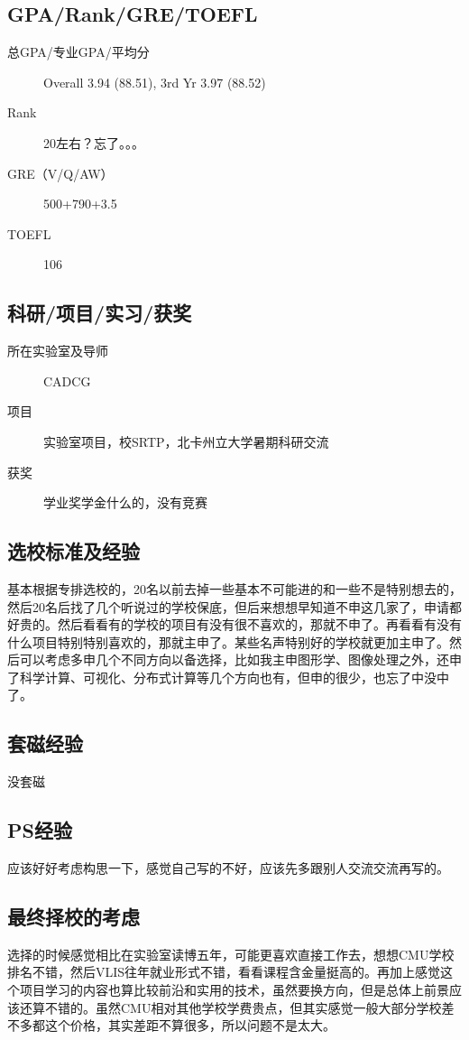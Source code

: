 \documentclass[11pt,fleqn,openany]{book} %
\begin{document}
\subsection*{GPA/Rank/GRE/TOEFL}
\begin{description}
\item[总GPA/专业GPA/平均分] Overall 3.94 (88.51), 3rd Yr 3.97 (88.52)
\item[Rank] 20左右？忘了。。。
\item[GRE（V/Q/AW）] 500+790+3.5
\item[TOEFL] 106
\end{description}

\subsection*{科研/项目/实习/获奖}
\begin{description}
\item[所在实验室及导师] CADCG
\item[项目] 实验室项目，校SRTP，北卡州立大学暑期科研交流
\item[获奖] 学业奖学金什么的，没有竞赛
\end{description}
\subsection*{选校标准及经验}
基本根据专排选校的，20名以前去掉一些基本不可能进的和一些不是特别想去的，然后20名后找了几个听说过的学校保底，但后来想想早知道不申这几家了，申请都好贵的。然后看看有的学校的项目有没有很不喜欢的，那就不申了。再看看有没有什么项目特别特别喜欢的，那就主申了。某些名声特别好的学校就更加主申了。然后可以考虑多申几个不同方向以备选择，比如我主申图形学、图像处理之外，还申了科学计算、可视化、分布式计算等几个方向也有，但申的很少，也忘了中没中了。
\subsection*{套磁经验}
没套磁
\subsection*{PS经验}
应该好好考虑构思一下，感觉自己写的不好，应该先多跟别人交流交流再写的。
\subsection*{最终择校的考虑}
选择的时候感觉相比在实验室读博五年，可能更喜欢直接工作去，想想CMU学校排名不错，然后VLIS往年就业形式不错，看看课程含金量挺高的。再加上感觉这个项目学习的内容也算比较前沿和实用的技术，虽然要换方向，但是总体上前景应该还算不错的。虽然CMU相对其他学校学费贵点，但其实感觉一般大部分学校差不多都这个价格，其实差距不算很多，所以问题不是太大。
\end{document}
